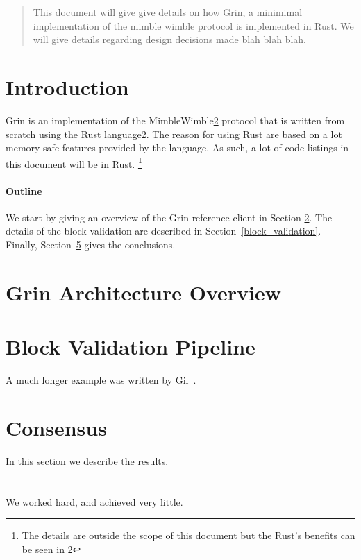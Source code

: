 \documentclass[12pt]{article}
\begin{document}
\maketitle

\begin{abstract}
This document will give give details on how Grin, a minimimal implementation of the mimble wimble protocol is implemented in Rust. We will give details regarding
design decisions made  blah blah blah.
\end{abstract}

\section{Introduction}
Grin is an implementation of the MimbleWimble\ref{} protocol that is written from scratch using the Rust language\ref{}. The reason for using Rust are based on a lot memory-safe features provided by the language. As such, a lot of code listings in this document will be in Rust. \footnote{The details are outside the scope of this document but the Rust's benefits can be seen in \ref{}}

\paragraph{Outline}

We start by giving an overview of the Grin reference client in Section \ref{}. The details of the block validation are described in Section~\ref{block_validation}.
Finally, Section~\ref{conclusions} gives the conclusions.

\section{Grin Architecture Overview}

\section{Block Validation Pipeline}\label{validation}
A much longer \LaTeXe{} example was written by Gil~\cite{Gil:02}.

\section{Consensus}\label{results}
In this section we describe the results.

\section{}\label{conclusions}
We worked hard, and achieved very little.



\end{document}
